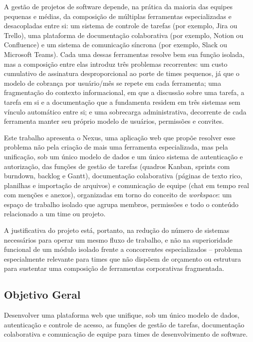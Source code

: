 \documentclass[12pt]{article}
\begin{document}
A gestão de projetos de software depende, na prática da maioria das equipes pequenas e médias, da composição de múltiplas ferramentas especializadas e desacopladas entre si: um sistema de controle de tarefas (por exemplo, Jira ou Trello), uma plataforma de documentação colaborativa (por exemplo, Notion ou Confluence) e um sistema de comunicação síncrona (por exemplo, Slack ou Microsoft Teams). Cada uma dessas ferramentas resolve bem sua função isolada, mas a composição entre elas introduz três problemas recorrentes: um custo cumulativo de assinatura desproporcional ao porte de times pequenos, já que o modelo de cobrança por usuário/mês se repete em cada ferramenta; uma fragmentação do contexto informacional, em que a discussão sobre uma tarefa, a tarefa em si e a documentação que a fundamenta residem em três sistemas sem vínculo automático entre si; e uma sobrecarga administrativa, decorrente de cada ferramenta manter seu próprio modelo de usuários, permissões e convites.

Este trabalho apresenta o Nexus, uma aplicação web que propõe resolver esse problema não pela criação de mais uma ferramenta especializada, mas pela unificação, sob um único modelo de dados e um único sistema de autenticação e autorização, das funções de gestão de tarefas (quadros Kanban, sprints com burndown, backlog e Gantt), documentação colaborativa (páginas de texto rico, planilhas e importação de arquivos) e comunicação de equipe (chat em tempo real com menções e anexos), organizadas em torno do conceito de \emph{workspace}: um espaço de trabalho isolado que agrupa membros, permissões e todo o conteúdo relacionado a um time ou projeto.

A justificativa do projeto está, portanto, na redução do número de sistemas necessários para operar um mesmo fluxo de trabalho, e não na superioridade funcional de um módulo isolado frente a concorrentes especializados -- problema especialmente relevante para times que não dispõem de orçamento ou estrutura para sustentar uma composição de ferramentas corporativas fragmentada.

\subsection*{Objetivo Geral}

Desenvolver uma plataforma web que unifique, sob um único modelo de dados, autenticação e controle de acesso, as funções de gestão de tarefas, documentação colaborativa e comunicação de equipe para times de desenvolvimento de software.
\end{document}
